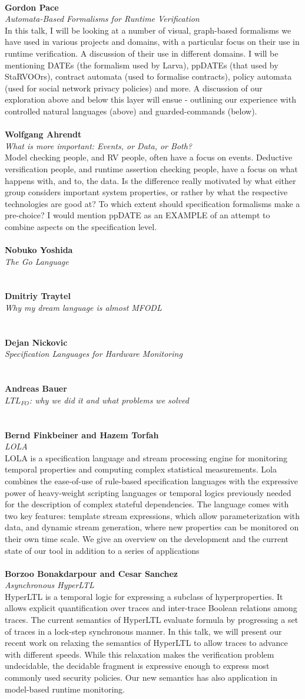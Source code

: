 \documentclass{article}
\newcommand{\talk}[3]{
\vspace{0.5em}~\\
\noindent
\textbf{#1}\\ 
\noindent\emph{#2}\\ 
\noindent#3\\
}
\begin{document}
\talk{Gordon Pace}{Automata-Based Formalisms for Runtime Verification}{In this talk, I will be looking at a number of visual, graph-based formalisms we have used in various projects and domains, with a particular focus on their use in runtime verification. A discussion of their use in different domains. I will be mentioning DATEs (the formalism used by Larva), ppDATEs (that used by StaRVOOrs), contract automata (used to formalise contracts), policy automata (used for social network privacy policies) and more. A discussion of our exploration above and below this layer will ensue - outlining our experience with controlled natural languages (above) and guarded-commands (below).}
\talk{Wolfgang Ahrendt}{What is more important: Events, or Data, or Both?}{Model checking people, and RV people, often have a focus on events. Deductive versification people, and runtime assertion checking people, have a focus on what happens with, and to, the data. Is the difference really motivated by what either group considers important system properties, or rather by what the respective technologies are good at? To which extent should specification formalisms make a pre-choice? I would mention ppDATE as an EXAMPLE of an attempt to combine aspects on the specification level.}
\talk{Nobuko Yoshida}{The Go Language}{}
\talk{Dmitriy Traytel}{Why my dream language is almost MFODL}{}
\talk{Dejan Nickovic}{Specification Languages for Hardware Monitoring}{}
\talk{Andreas Bauer}{$LTL_{FO}$: why we did it and what problems we solved}{}
\talk{Bernd Finkbeiner and Hazem Torfah}{LOLA}{LOLA is a specification language and stream processing engine for monitoring temporal properties and computing complex statistical measurements. Lola combines the ease-of-use of rule-based specification languages with the expressive power of heavy-weight scripting languages or temporal logics previously needed for the description of complex stateful dependencies. The language comes with two key features: template stream expressions, which allow parameterization with data, and dynamic stream generation, where new properties can be monitored on their own time scale. We give an overview on the development and the current state of our tool in addition to a series of applications}
\talk{Borzoo Bonakdarpour and Cesar Sanchez}{Asynchronous HyperLTL}{HyperLTL is a temporal logic for expressing a subclass of hyperproperties. It allows explicit quantification over traces and inter-trace Boolean relations among traces. The current semantics of HyperLTL evaluate formula by progressing a set of traces in a lock-step synchronous manner. In this talk, we will present our recent work on relaxing the semantics of HyperLTL to allow traces to advance with different speeds. While this relaxation makes the verification problem undecidable, the decidable fragment is expressive enough to express most commonly used security policies. Our new semantics has also application in model-based runtime monitoring.}
\end{document}
